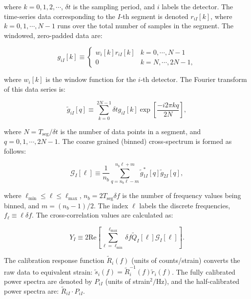 where $k = 0, 1, 2, \cdots$, $\delta t$ is the sampling period, and $i$
labels the detector. The time-series data corresponding to the $I$-th
segment is denoted $r_{iI}[k]$, where $k = 0, 1, \cdots, N-1$ runs over
the total number of samples in the segment. The windowed, zero-padded
data are:

\begin{equation}
g_{iI}[k] \equiv \left\{ \begin{array}{cl}
w_i[k] r_{iI}[k] & k = 0, \cdots, N-1 \\
0 & k = N, \cdots, 2N-1,
\end{array} \right.
\end{equation}

where $w_i[k]$ is the window function for the $i$-th detector. The
Fourier transform of this data series is:

\begin{equation}
\widetilde{g}_{iI}[q] \equiv \sum_{k = 0}^{2N-1} \delta t g_{iI}[k]
\exp \left[ \frac{-i 2 \pi k q}{2N} \right],
\end{equation}

where $N = T_{\mathrm{seg}}/\delta t$ is the number of data points in a
segment, and $q = 0, 1, \cdots, 2N-1$. The coarse grained (binned)
cross-spectrum is formed as follows:

\begin{equation}
\mathcal{G}_{I}[\ell] \equiv \frac{1}{n_b} \sum_{q = n_b \ell -m}^{n_b
\ell + m} \widetilde{g}^*_{1I}[q] \widetilde{g}_{2I}[q],
\end{equation}

where $\ell_{\mathrm{min}} \le \ell \le \ell_{\mathrm{max}}$, $n_b = 2
T_{\mathrm{seg}} \delta f$ is the number of frequency values being
binned, and $m = (n_b - 1) / 2$. The index $\ell$ labels the discrete
frequencies, $f_{\ell} \equiv \ell \delta f$. The cross-correlation
values are calculated as:

\begin{equation}
Y_{I} \equiv 2 \mathrm{Re} \left[ \sum_{\ell =
\ell_{\mathrm{min}}}^{\ell_{\mathrm{max}}} \delta f \widetilde
Q_I[\ell] \mathcal{G}_{I}[\ell] \right].
\end{equation}

The calibration response function $\widetilde R_i(f)$ (units of
counts/strain) converts the raw data to equivalent strain: $\widetilde
s_i(f) = \widetilde R_i^{-1}(f) \widetilde r_i(f)$.
The fully calibrated power spectra are denoted by $P_{iI}$ (units of
strain$^2/$Hz), and the half-calibrated power spectra are:
$\widetilde R_{iI} \cdot P_{iI}$.


